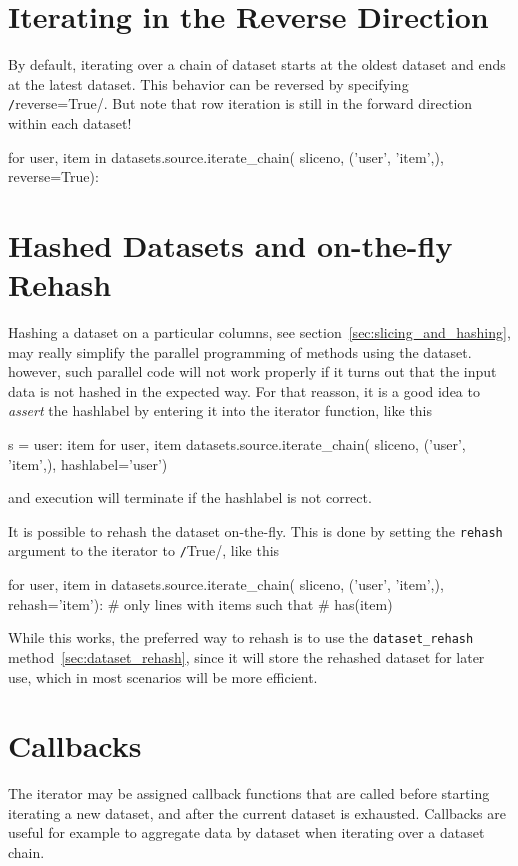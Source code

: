 \section{Iterating in the Reverse Direction}
By default, iterating over a chain of dataset starts at the oldest
dataset and ends at the latest dataset.  This behavior can be
reversed by specifying \texttt/reverse=True/.  But note
that row iteration is still in the forward direction within each
dataset!
\begin{python}
for user, item in datasets.source.iterate_chain(
    sliceno, ('user', 'item',),
    reverse=True):
\end{python}



\section{Hashed Datasets and on-the-fly Rehash}
Hashing a dataset on a particular columns, see
section~\ref{sec:slicing_and_hashing}, may really simplify the
parallel programming of methods using the dataset.  however, such
parallel code will not work properly if it turns out that the input
data is not hashed in the expected way.  For that reasson, it is a
good idea to \emph{assert} the hashlabel by entering it into the
iterator function, like this
\begin{python}
s = {user: item for user, item datasets.source.iterate_chain(
     sliceno, ('user', 'item',), hashlabel='user')}
\end{python}
and execution will terminate if the hashlabel is not correct.

It is possible to rehash the dataset on-the-fly.  This is done by
setting the \texttt{rehash} argument to the iterator to
\texttt/True/, like this
\begin{python}
for user, item in datasets.source.iterate_chain(
        sliceno, ('user', 'item',),
        rehash='item'):
    # only lines with items such that
    # has(item) %
\end{python}
While this works, the preferred way to rehash is to use the
\texttt{dataset\_rehash} method~\ref{sec:dataset_rehash},
since it will store the rehashed dataset for later use, which in most
scenarios will be more efficient.






\section{Callbacks}
\label{sec:callback}
The iterator may be assigned callback functions that are called before
starting iterating a new dataset, and after the current dataset is
exhausted.  Callbacks are useful for example to aggregate data by
dataset when iterating over a dataset chain.

